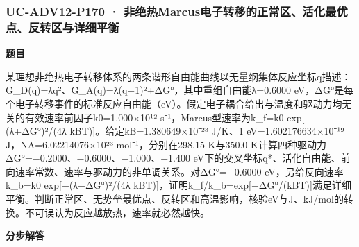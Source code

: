 \documentclass[UTF8,11pt,a4paper]{ctexart}
\begin{document}
\subsubsection*{UC-ADV12-P170 · 非绝热Marcus电子转移的正常区、活化最优点、反转区与详细平衡}
\noindent\textbf{题目}\par
某理想非绝热电子转移体系的两条谐形自由能曲线以无量纲集体反应坐标q描述：G\_D(q)=λq²、G\_A(q)=λ(q−1)²+ΔG°，其中重组自由能λ=0.6000 eV，ΔG°是每个电子转移事件的标准反应自由能（eV）。假定电子耦合给出与温度和驱动力均无关的有效速率前因子k0=1.000×10¹² s⁻¹，Marcus型速率为k\_f=k0 exp[−(λ+ΔG°)²/(4λ kBT)]。给定kB=1.380649×10⁻²³ J/K、1 eV=1.602176634×10⁻¹⁹ J，NA=6.02214076×10²³ mol⁻¹，分别在298.15 K与350.0 K计算四种驱动力ΔG°=−0.2000、−0.6000、−1.000、−1.400 eV下的交叉坐标q*、活化自由能、前向速率常数、速率与驱动力的非单调关系。对ΔG°=−0.6000 eV，另给反向速率k\_b=k0 exp[−(λ−ΔG°)²/(4λ kBT)]，证明k\_f/k\_b=exp[−ΔG°/(kBT)]满足详细平衡。判断正常区、无势垒最优点、反转区和高温影响，核验eV与J、kJ/mol的转换。不可误认为反应越放热，速率就必然越快。\par
\medskip\noindent\textbf{分步解答}
\end{document}
